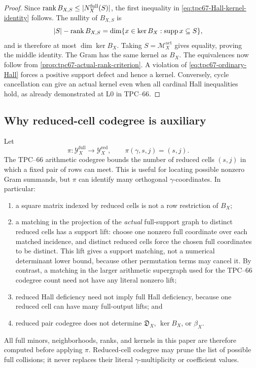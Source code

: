 \begin{proof}
Since
\(\operatorname{rank} B_{X,S}\le|N_X^{\mathrm{full}}(S)|\),
the first inequality in
\eqref{eq:tpc67-Hall-kernel-identity} follows.  The nullity of
\(B_{X,S}\) is
\[
 |S|-\operatorname{rank} B_{X,S}
 =
 \dim\{x\in\ker B_X:\operatorname{supp} x\subseteq S\},
 \]
and is therefore at most \(\dim\ker B_X\).  Taking
\(S=\mathcal M_X^{\mathrm{act}}\) gives equality, proving the middle
identity.  The Gram has the same kernel as \(B_X\).
The equivalences now follow from
\cref{prop:tpc67-actual-rank-criterion}.  A violation of
\eqref{eq:tpc67-ordinary-Hall} forces a positive support defect and hence
a kernel.  Conversely, cycle cancellation can give an actual kernel even
when all cardinal Hall inequalities hold, as already demonstrated at L0
in TPC--66.
\end{proof}

\subsection{Why reduced-cell codegree is auxiliary}

Let
\begin{equation}
 \pi:\mathcal Y_X^{\mathrm{full}}\longrightarrow
 \mathcal Y_X^{\mathrm{red}},
 \qquad
 \pi(\gamma,s,j)=(s,j).
 \label{eq:tpc67-full-to-reduced-projection}
\end{equation}
The TPC--66 arithmetic codegree bounds the number of reduced cells
\((s,j)\) in which a fixed pair of rows can meet.  This is useful for
locating possible nonzero Gram summands, but \(\pi\) can identify many
orthogonal \(\gamma\)-coordinates.  In particular:
\begin{enumerate}[label=\textup{(\alph*)},leftmargin=3em]
 \item a square matrix indexed by reduced cells is not a row restriction
       of \(B_X\);
\item a matching in the projection of the \emph{actual} full-support graph
       to distinct reduced cells has a support lift: choose one nonzero
       full coordinate over each matched incidence, and distinct reduced
       cells force the chosen full coordinates to be distinct.  This lift
       gives a support matching, not a numerical determinant lower bound,
       because other permutation terms may cancel it.  By contrast, a
       matching in the larger arithmetic supergraph used for the TPC--66
       codegree count need not have any literal nonzero lift;
 \item reduced Hall deficiency need not imply full Hall deficiency,
       because one reduced cell can have many full-output lifts; and
 \item reduced pair codegree does not determine
       \(\mathfrak D_X\), \(\ker B_X\), or \(\beta_X\).
\end{enumerate}
All full minors, neighborhoods, ranks, and kernels in this paper are
therefore computed before applying \(\pi\).  Reduced-cell codegree may
prune the list of possible full collisions; it never replaces their
literal \(\gamma\)-multiplicity or coefficient values.

